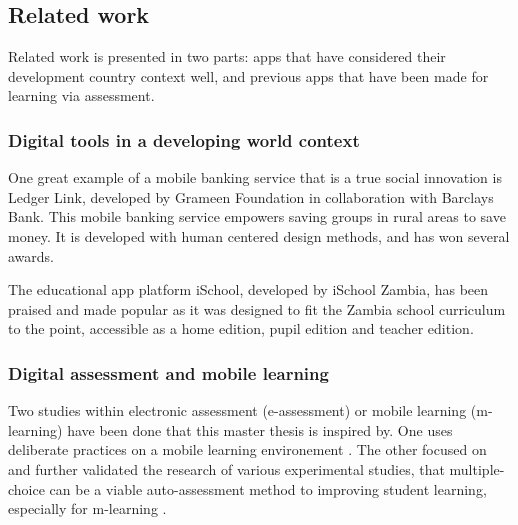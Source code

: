 \subsection{Related work}

Related work is presented in two parts: apps that have considered their development country context well, and previous apps that have been made for learning via assessment.

\subsubsection{Digital tools in a developing world context}

One great example of a mobile banking service that is a true social innovation is Ledger Link, developed by Grameen Foundation in collaboration with Barclays Bank. This mobile banking service empowers saving groups in rural areas to save money. It is developed with human centered design methods, and has won several awards. \citep{nissar}

The educational app platform iSchool, developed by iSchool Zambia, has been praised and made popular as it was designed to fit the Zambia school curriculum to the point, accessible as a home edition, pupil edition and teacher edition.

\subsubsection{Digital assessment and mobile learning}

Two studies within electronic assessment (e-assessment) or mobile learning (m-learning) have been done that this master thesis is inspired by. One uses deliberate practices on a mobile learning environement \citep{yengin}. The other focused on and further validated the research of various experimental studies, that multiple-choice can be a viable auto-assessment method to improving student learning, especially for m-learning \citep{de-marcos}.
